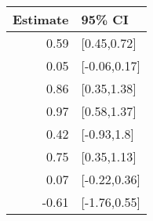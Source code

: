 \begin{tabular}{rl}
  \hline
Estimate & 95\% CI \\ 
  \hline
0.59 & [0.45,0.72] \\ 
  0.05 & [-0.06,0.17] \\ 
  0.86 & [0.35,1.38] \\ 
  0.97 & [0.58,1.37] \\ 
  0.42 & [-0.93,1.8] \\ 
  0.75 & [0.35,1.13] \\ 
  0.07 & [-0.22,0.36] \\ 
  -0.61 & [-1.76,0.55] \\ 
   \hline
\end{tabular}

